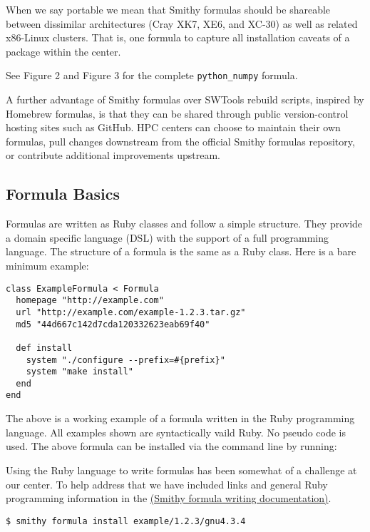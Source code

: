 \documentclass{acm_proc_article-sp}
\begin{document}
When we say portable we mean that Smithy formulas should be shareable between
dissimilar architectures (Cray XK7, XE6, and XC-30) as well as related x86-Linux
clusters. That is, one formula to capture all installation caveats of a package
within the center.

See Figure 2 and Figure 3
for the complete \texttt{python\_numpy} formula.

A further advantage of Smithy formulas over SWTools rebuild scripts, inspired by
Homebrew formulas, is that they can be shared through public version-control
hosting sites such as GitHub. HPC centers can choose to maintain their own
formulas, pull changes downstream from the official Smithy formulas repository,
or contribute additional improvements upstream.

\subsection{Formula Basics}

Formulas are written as Ruby classes and follow a simple structure. They
provide a domain specific language (DSL) with the support of a full programming
language. The structure of a formula is the same as a Ruby class. Here is a bare
minimum example:

\begin{quoting}
\begin{verbatim}
class ExampleFormula < Formula
  homepage "http://example.com"
  url "http://example.com/example-1.2.3.tar.gz"
  md5 "44d667c142d7cda120332623eab69f40"

  def install
    system "./configure --prefix=#{prefix}"
    system "make install"
  end
end
\end{verbatim}
\end{quoting}

The above is a working example of a formula written in the Ruby programming
language. All examples shown are syntactically vaild Ruby. No pseudo code is
used. The above formula can be installed via the command line by running:

Using the Ruby language to write formulas has been somewhat of a challenge at
our center. To help address that we have included links and general Ruby
programming information in the
\href{http://anthonydigirolamo.github.io/smithy/smithyformula.5.html#COMMON-OPERATIONS}{(Smithy formula writing documentation)}.

\begin{quoting}
\begin{verbatim}
$ smithy formula install example/1.2.3/gnu4.3.4
\end{verbatim}
\end{quoting}
\end{document}
